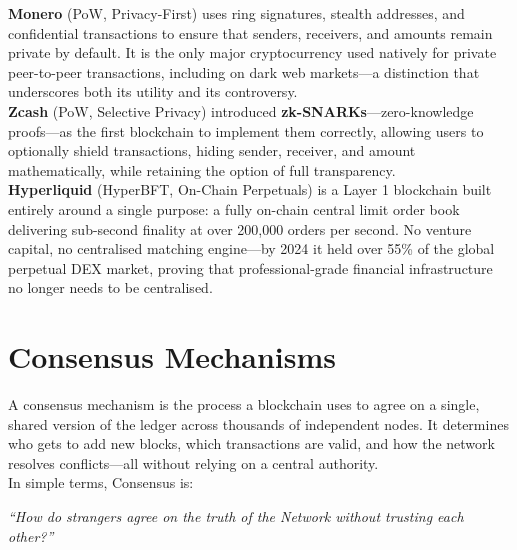 \documentclass[12pt, a4paper, oneside]{report}
\theoremstyle{definition}
\begin{document}
\textbf{Monero} (PoW, Privacy-First) uses ring signatures, stealth addresses, and 
confidential transactions to ensure that senders, receivers, and amounts remain 
private by default. It is the only major cryptocurrency used natively for private 
peer-to-peer transactions, including on dark web markets—a distinction that 
underscores both its utility and its controversy.\\[0.4cm]

\textbf{Zcash} (PoW, Selective Privacy) introduced \textbf{zk-SNARKs}—zero-knowledge 
proofs—as the first blockchain to implement them correctly, allowing users to 
optionally shield transactions, hiding sender, receiver, and amount 
mathematically, while retaining the option of full transparency.\\


\textbf{Hyperliquid} (HyperBFT, On-Chain Perpetuals) is a Layer 1 blockchain 
built entirely around a single purpose: a fully on-chain central limit order 
book delivering sub-second finality at over 200,000 orders per second. No 
venture capital, no centralised matching engine—by 2024 it held over 55\% 
of the global perpetual DEX market, proving that professional-grade financial 
infrastructure no longer needs to be centralised.








\section{Consensus Mechanisms}
\label{chap:consensus}



A consensus mechanism is the process a blockchain uses to agree on a single, shared 
version of the ledger across thousands of independent nodes. It determines who gets 
to add new blocks, which transactions are valid, and how the network resolves 
conflicts—all without relying on a central authority.\\[0.4cm]

In simple terms, Consensus is:
\begin{center}
\textit{``How do strangers agree on the truth of the Network without trusting each other?''}\\[1cm]

\end{center}
\end{document}

